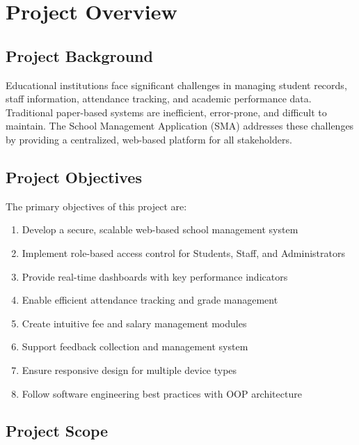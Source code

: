 \documentclass[12pt,a4paper]{article}
\begin{document}
\section{Project Overview}

\subsection{Project Background}

Educational institutions face significant challenges in managing student records, staff information, attendance tracking, and academic performance data. Traditional paper-based systems are inefficient, error-prone, and difficult to maintain. The School Management Application (SMA) addresses these challenges by providing a centralized, web-based platform for all stakeholders.

\subsection{Project Objectives}

The primary objectives of this project are:

\begin{enumerate}[noitemsep]
    \item Develop a secure, scalable web-based school management system
    \item Implement role-based access control for Students, Staff, and Administrators
    \item Provide real-time dashboards with key performance indicators
    \item Enable efficient attendance tracking and grade management
    \item Create intuitive fee and salary management modules
    \item Support feedback collection and management system
    \item Ensure responsive design for multiple device types
    \item Follow software engineering best practices with OOP architecture
\end{enumerate}

\subsection{Project Scope}
\end{document}

